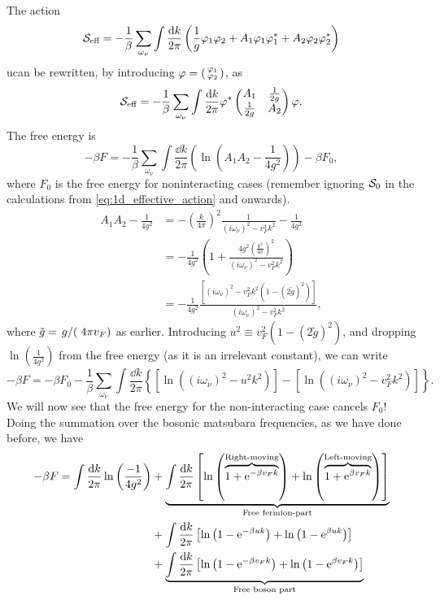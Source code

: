 The action
\begin{equation}
	\mathcal{S}_{\text{eff}} = -\frac1\beta\sum_{\omega_\nu}\int\frac{\dd k}{2\pi}\left(\frac1g\varphi_1\varphi_2+A_1\varphi_1\varphi_1^*+A_2\varphi_2\varphi_2^*\right)
\end{equation}
ucan be rewritten, by introducing \(\varphi = \begin{psmallmatrix}
\varphi_1 \\ \varphi_2 
\end{psmallmatrix}\), as
\begin{equation}
\mathcal{S}_{\text{eff}} = -\frac1\beta\sum_{\omega_\nu}\int\frac{\dd k}{2\pi}\varphi^*\begin{pmatrix}
A_1 & \frac{1}{2g} \\
\frac{1}{2g} & A_2
\end{pmatrix}\varphi.
\end{equation}
The free energy is
\begin{equation}
-\beta F = -\frac1\beta\sum_{\omega_\nu}\int\frac{\dd k}{2\pi}\left(\ln(A_1A_2-\frac{1}{4g^2})\right) - \beta F_0,
\end{equation}
where \(F_0\) is the free energy for noninteracting cases (remember ignoring  \(\mathcal{S}_0\) in the calculations from \cref{eq:1d_effective_action} and onwards).
\begin{align*}
A_1A_2 -\frac{1}{4g^2} &= -\left(\frac{k}{4\pi}\right)^2\frac{1}{(i\omega_\nu)^2-v_F^2k^2} - \frac{1}{4g^2} \\
&= -\frac{1}{4g^2}\left(1+\frac{4g^2\left(\frac{k^2}{4\pi}\right)^2}{(i\omega_\nu)^2-v_F^2k^2}\right) \\
&=-\frac{1}{4g^2}\frac{\left[(i\omega_\nu)^2 - v_F^2k^2(1-(2\tilde{g})^2)\right]}{(i\omega_\nu)^2-v_F^2k^2},
\end{align*}
where \(\tilde{g} = \flatfrac{g}(4\pi v_F)\) as earlier. Introducing \(u^2 \equiv v_F^2(1-(2\tilde{g})^2)\), and dropping \(\ln(\frac{1}{4g^2})\) from the free energy (as it is an irrelevant constant), we can write
\begin{equation}
-\beta F = -\beta F_0 -\frac{1}{\beta}\sum_{\omega_\nu}\int\frac{\dd k}{2\pi}\left\{\left[\ln((i\omega_\nu)^2-u^2k^2)\right] - \left[\ln((i\omega_\nu)^2-v_F^2k^2)\right]\right\}.
\end{equation}
We will now see that the free energy for the non-interacting case cancels $F_0$! Doing the summation over the bosonic matsubara frequencies, as we have done before, we have
\begin{align*}
-\beta F = \int\frac{\dd k}{2\pi}\ln\left(\frac{-1}{4g^2}\right) &+ \underbrace{\int\frac{\dd k}{2\pi} \left[\ln\left(\overbrace{1+\mathrm{e}^{-\beta v_Fk}}^{\text{Right-moving}}\right)+ \ln\left(\overbrace{1+\mathrm{e}^{\beta v_Fk}}^{\text{Left-moving}}\right)\right]}_{\text{Free fermion-part}}\\
&+ \int\frac{\dd k}{2\pi}\left[\ln\left(1-\mathrm{e}^{-\beta uk}\right) + \ln\left(1-\mathrm{e}^{\beta uk}\right)\right] \\
&+ \underbrace{\int\frac{\dd k}{2\pi}\left[\ln\left(1-\mathrm{e}^{-\beta v_Fk}\right) + \ln\left(1-\mathrm{e}^{\beta v_Fk}\right)\right]}_{\text{Free boson part}}
\end{align*}
